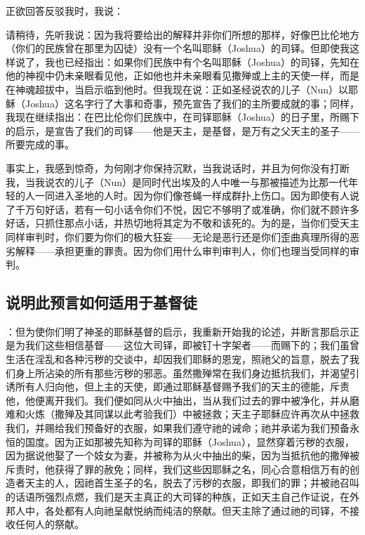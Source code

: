 正欲回答反驳我时，我说：\par

请稍待，先听我说：因为我将要给出的解释并非你们所想的那样，好像巴比伦地方（你们的民族曾在那里为囚徒）没有一个名叫耶稣（Joshua）的司铎。但即使我这样说了，我也已经指出：如果你们民族中有个名叫耶稣（Joshua）的司铎，先知在他的神视中仍未亲眼看见他，正如他也并未亲眼看见撒殚或上主的天使一样，而是在神魂超拔中，当启示临到他时。但我现在说：正如圣经说农的儿子（Nun）以耶稣（Joshua）这名字行了大事和奇事，预先宣告了我们的主所要成就的事；同样，我现在继续指出：在巴比伦你们民族中，在司铎耶稣（Joshua）的日子里，所赐下的启示，是宣告了我们的司铎——他是天主，是基督，是万有之父天主的圣子——所要完成的事。\par

事实上，我感到惊奇，为何刚才你保持沉默，当我说话时，并且为何你没有打断我，当我说农的儿子（Nun）是同时代出埃及的人中唯一与那被描述为比那一代年轻的人一同进入圣地的人时。因为你们像苍蝇一样成群扑上伤口。因为即使有人说了千万句好话，若有一句小话令你们不悦，因它不够明了或准确，你们就不顾许多好话，只抓住那点小话，并热切地将其定为不敬和该死的。为的是，当你们受天主同样审判时，你们要为你们的极大狂妄——无论是恶行还是你们歪曲真理所得的恶劣解释——承担更重的罪责。因为你们用什么审判审判人，你们也理当受同样的审判。\par


\subsection{说明此预言如何适用于基督徒}

：但为使你们明了神圣的耶稣基督的启示，我重新开始我的论述，并断言那启示正是为我们这些相信基督——这位大司铎，即被钉十字架者——而赐下的；我们虽曾生活在淫乱和各种污秽的交谈中，却因我们耶稣的恩宠，照祂父的旨意，脱去了我们身上所沾染的所有那些污秽的邪恶。虽然撒殚常在我们身边抵抗我们，并渴望引诱所有人归向他，但上主的天使，即通过耶稣基督赐予我们的天主的德能，斥责他，他便离开我们。我们便如同从火中抽出，当从我们过去的罪中被净化，并从磨难和火炼（撒殚及其同谋以此考验我们）中被拯救；天主子耶稣应许再次从中拯救我们，并赐给我们预备好的衣服，如果我们遵守祂的诫命；祂并承诺为我们预备永恒的国度。因为正如那被先知称为司铎的耶稣（Joshua），显然穿着污秽的衣服，因为据说他娶了一个妓女为妻，并被称为从火中抽出的柴，因为当抵抗他的撒殚被斥责时，他获得了罪的赦免；同样，我们这些因耶稣之名，同心合意相信万有的创造者天主的人，因祂首生圣子的名，脱去了污秽的衣服，即我们的罪；并被祂召叫的话语所强烈点燃，我们是天主真正的大司铎的种族，正如天主自己作证说，在外邦人中，各处都有人向祂呈献悦纳而纯洁的祭献。但天主除了通过祂的司铎，不接收任何人的祭献。\par

